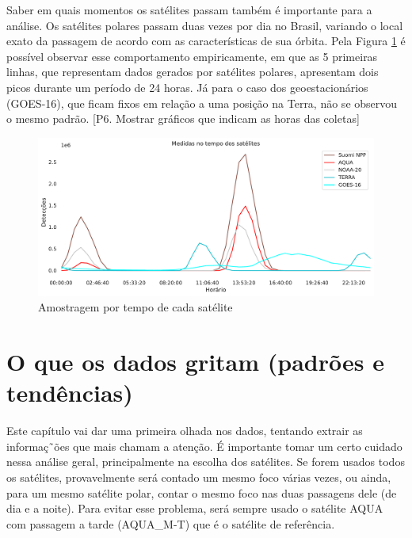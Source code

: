 \documentclass[cic,tc]{iiufrgs}
\begin{document}
Saber em quais momentos os satélites passam também é importante para a análise. 
Os satélites polares passam duas vezes por dia no Brasil, variando o local 
exato da passagem de acordo com as características de sua órbita. Pela  
Figura \ref{fig:tempo_medidas_satelites} é possível observar esse comportamento 
empiricamente, em que as 5 primeiras linhas, que representam dados gerados por 
satélites polares, apresentam dois picos durante um período de 24 horas. Já para o  
caso dos geoestacionários (GOES-16), que ficam fixos em relação a uma posição 
na Terra, não se observou o mesmo padrão. 
[P6. Mostrar gráficos que indicam as horas das coletas] \par

\begin{figure}
    \caption{Amostragem por tempo de cada satélite}
    \begin{center}
        \includegraphics[width=35em]{tempo_medidas_satelites}
    \end{center}
    \label{fig:tempo_medidas_satelites}
\end{figure}

\section{O que os dados gritam (padrões e tendências)}

Este capítulo vai dar uma primeira olhada nos dados, tentando extrair as 
informaç˜ões que mais chamam a atenção. É importante tomar um certo cuidado nessa 
análise geral, principalmente na escolha dos satélites. Se forem usados todos os 
satélites, provavelmente será contado um mesmo foco várias vezes, ou ainda, para um 
mesmo satélite polar, contar o mesmo foco nas duas passagens dele (de dia e a 
noite). Para evitar esse problema, será sempre usado o satélite AQUA com passagem a 
tarde (AQUA\_M-T) que é o satélite de referência. \par
\end{document}
